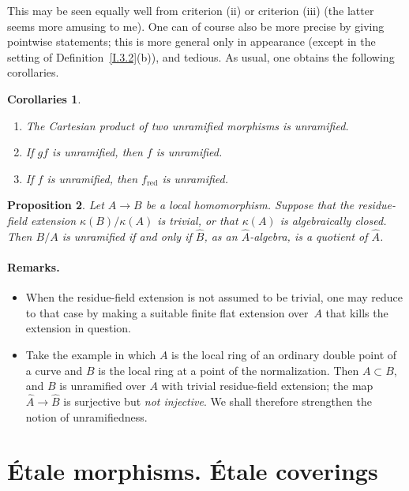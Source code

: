 \documentclass[11pt,oneside]{amsbook}
\newtheorem{proposition}{Proposition}[section]
\newtheorem{corollaries}[proposition]{Corollaries}
\begin{document}
This may be seen equally well from criterion \textup{(ii)} or criterion
\textup{(iii)} (the latter seems more amusing to me).  One can of course
also be more precise by giving pointwise statements; this is more general
only in appearance (except in the setting of Definition~\ref{I.3.2}(b)), and
tedious.  As usual, one obtains the following corollaries.

\begin{corollaries}
\label{I.3.6}
\begin{enumerate}
\item[(iv)] The Cartesian product of two unramified morphisms is unramified.
\item[(v)] If \(gf\) is unramified, then \(f\) is unramified.
\item[(vi)] If \(f\) is unramified, then \(f_{\mathrm{red}}\) is
  unramified.
\end{enumerate}
\end{corollaries}

\begin{proposition}
\label{I.3.7}
Let \(A\to B\) be a local homomorphism.  Suppose that the residue-field
extension \(\kappa(B)/\kappa(A)\) is trivial, or that \(\kappa(A)\) is
algebraically closed.  Then \(B/A\) is unramified if and only if
\(\widehat B\), as an \(\widehat A\)-algebra, is a quotient of
\(\widehat A\).
\end{proposition}

\paragraph{Remarks.}
\begin{itemize}
\item When the residue-field extension is not assumed to be trivial, one may
  reduce to that case by making a suitable finite flat extension over~\(A\)
  that kills the extension in question.
\item Take the example in which \(A\) is the local ring of an ordinary
  double point of a curve and \(B\) is the local ring at a point of the
  normalization.  Then \(A\subset B\), and \(B\) is unramified
  over \(A\) with
  trivial residue-field extension; the map
  \(\widehat A\to\widehat B\) is surjective but \emph{not injective}.
  We shall therefore strengthen the notion of unramifiedness.
\end{itemize}

\section{Étale morphisms. Étale coverings}
\label{I.4}
\end{document}
